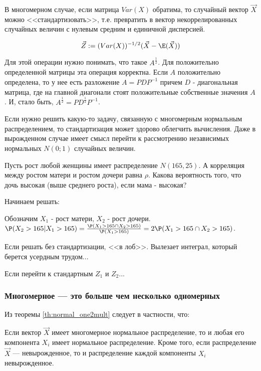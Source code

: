 В многомерном случае, если матрица $Var(X)$ обратима, то случайный вектор $\vec{X}$ можно <<стандартизовать>>, т.е. превратить в вектор некоррелированных случайных величин с нулевым средним и единичной дисперсией.

\begin{equation}
\vec{Z}:=(Var(X))^{-1/2}(\vec{X}-\E(\vec{X}))
\end{equation}

Для этой операции нужно понимать, что такое $A^{\frac{1}{2}}$. Для положительно определенной матрицы эта операция корректна. Если $A$ положительно определена, то у нее есть разложение $A=PDP^{-1}$ причем $D$ - диагональная матрица, где на главной диагонали стоят положительные собственные значения $A$. И, стало быть, $A^{\frac{1}{2}}=PD^{\frac{1}{2}}P^{-1}$.

Если нужно решить какую-то задачу, связанную с многомерным нормальным распределением, то стандартизация может здорово облегчить вычисления. Даже в вырожденном случае имеет смысл перейти к рассмотрению независимых нормальных $N(0;1)$ случайных величин.
\begin{myex}
Пусть рост любой женщины имеет распределение $N(165,25)$. А корреляция между ростом матери и ростом дочери равна $\rho$. Какова вероятность того, что дочь высокая (выше среднего роста), если мама - высокая?

Начинаем решать:

Обозначим $X_{1}$ - рост матери, $X_{2}$ - рост дочери. $\P(X_{2}>165|X_{1}>165)=\frac{\P(X_{1}>165\cap X_{2}>165)}{\P(X_{1}>165)}=2\P(X_{1}>165\cap X_{2}>165)$.

Если решать без стандартизации, <<в лоб>>. Вылезает интеграл, который берется усердным трудом...

Если перейти к стандартным $Z_{1}$ и $Z_{2}$...



\end{myex}


\subsubsection*{Многомерное --- это больше чем несколько одномерных}

Из теоремы \ref{th:normal_one2mult} следует в частности, что:

\begin{myth}
Если вектор $\vec{X}$ имеет многомерное нормальное распределение, то и любая его компонента $X_{i}$ имеет нормальное распределение. Кроме того, если распределение $\vec{X}$ --- невырожденное, то и распределение каждой компоненты $X_{i}$ невырожденное.
\end{myth}


